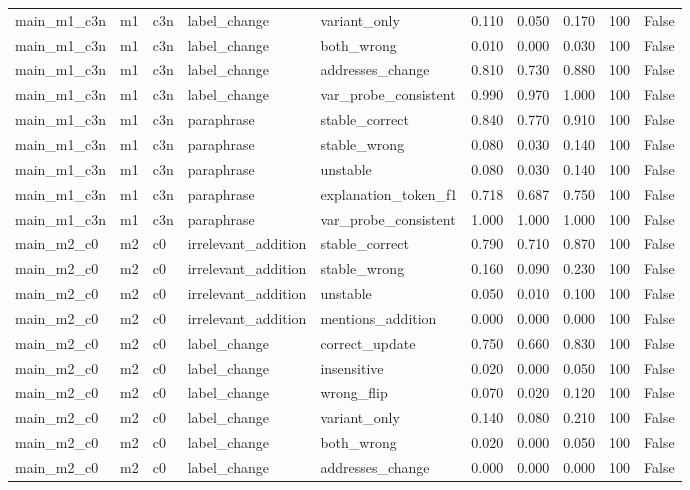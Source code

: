 \begin{tabular}{llllllllll}
main\_m1\_c3n & m1 & c3n & label\_change & variant\_only & 0.110 & 0.050 & 0.170 & 100 & False \\
main\_m1\_c3n & m1 & c3n & label\_change & both\_wrong & 0.010 & 0.000 & 0.030 & 100 & False \\
main\_m1\_c3n & m1 & c3n & label\_change & addresses\_change & 0.810 & 0.730 & 0.880 & 100 & False \\
main\_m1\_c3n & m1 & c3n & label\_change & var\_probe\_consistent & 0.990 & 0.970 & 1.000 & 100 & False \\
main\_m1\_c3n & m1 & c3n & paraphrase & stable\_correct & 0.840 & 0.770 & 0.910 & 100 & False \\
main\_m1\_c3n & m1 & c3n & paraphrase & stable\_wrong & 0.080 & 0.030 & 0.140 & 100 & False \\
main\_m1\_c3n & m1 & c3n & paraphrase & unstable & 0.080 & 0.030 & 0.140 & 100 & False \\
main\_m1\_c3n & m1 & c3n & paraphrase & explanation\_token\_f1 & 0.718 & 0.687 & 0.750 & 100 & False \\
main\_m1\_c3n & m1 & c3n & paraphrase & var\_probe\_consistent & 1.000 & 1.000 & 1.000 & 100 & False \\
main\_m2\_c0 & m2 & c0 & irrelevant\_addition & stable\_correct & 0.790 & 0.710 & 0.870 & 100 & False \\
main\_m2\_c0 & m2 & c0 & irrelevant\_addition & stable\_wrong & 0.160 & 0.090 & 0.230 & 100 & False \\
main\_m2\_c0 & m2 & c0 & irrelevant\_addition & unstable & 0.050 & 0.010 & 0.100 & 100 & False \\
main\_m2\_c0 & m2 & c0 & irrelevant\_addition & mentions\_addition & 0.000 & 0.000 & 0.000 & 100 & False \\
main\_m2\_c0 & m2 & c0 & label\_change & correct\_update & 0.750 & 0.660 & 0.830 & 100 & False \\
main\_m2\_c0 & m2 & c0 & label\_change & insensitive & 0.020 & 0.000 & 0.050 & 100 & False \\
main\_m2\_c0 & m2 & c0 & label\_change & wrong\_flip & 0.070 & 0.020 & 0.120 & 100 & False \\
main\_m2\_c0 & m2 & c0 & label\_change & variant\_only & 0.140 & 0.080 & 0.210 & 100 & False \\
main\_m2\_c0 & m2 & c0 & label\_change & both\_wrong & 0.020 & 0.000 & 0.050 & 100 & False \\
main\_m2\_c0 & m2 & c0 & label\_change & addresses\_change & 0.000 & 0.000 & 0.000 & 100 & False \\

\end{tabular}
